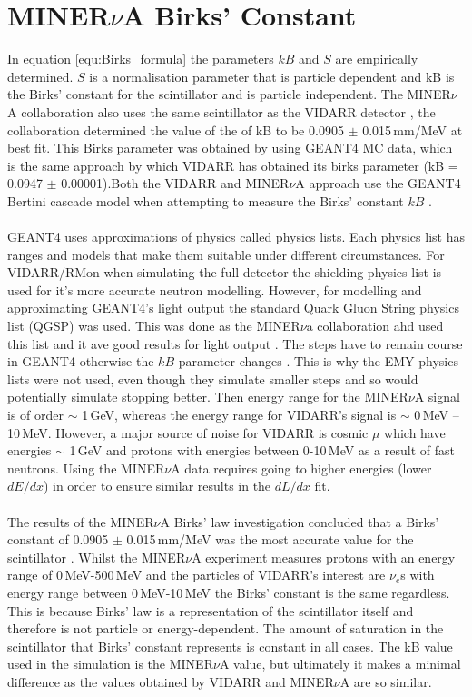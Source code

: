 \section{MINER$\nu$A Birks' Constant}\label{sec:GEANT4Simulation_MINERvABirksConstant}
In equation \ref{equ:Birks_formula} the parameters $kB$ and $S$ are empirically determined. $S$ is a normalisation parameter that is particle dependent and kB is the Birks' constant for the scintillator and is particle independent. The MINER$\nu$A collaboration \cite{aliaga_2015} also uses the same scintillator as the VIDARR detector \cite{aliaga_2014}, the collaboration determined the value of the of kB to be 0.0905 $\pm$ 0.015\,mm/MeV at best fit. This Birks parameter was obtained by using GEANT4 MC data, which is the same approach by which VIDARR has obtained its birks parameter (kB = 0.0947 $\pm$ 0.00001).Both the VIDARR and MINER$\nu$A approach use the GEANT4 Bertini cascade model when attempting to measure the Birks' constant $kB$ \cite{Heikkinen_2003}. 
\\\\GEANT4 uses approximations of physics called physics lists. Each physics list has ranges and models that make them suitable under different circumstances. For VIDARR/RMon when simulating the full detector the shielding physics list is used for it's more accurate neutron modelling. However, for modelling and approximating GEANT4's light output the standard Quark Gluon String physics list (QGSP) was used. This was done as the MINER$\nu$a collaboration ahd used this list and it ave good results for light output \cite{Patrick_2018}. The steps have to remain course in GEANT4 otherwise the $kB$ parameter changes  \cite{aliaga_2015}. This is why the EMY physics lists were not used, even though they simulate smaller steps and so would potentially simulate stopping better. Then energy range for the MINER$\nu$A signal is of order $\sim$ 1\,GeV, whereas the energy range for VIDARR's signal is $\sim$ 0\,MeV -- 10\,MeV. However, a major source of noise for VIDARR is cosmic $\mu$ which have energies $\sim$ 1\,GeV and protons with energies between 0-10\,MeV as a result of fast neutrons. Using the MINER$\nu$A data requires going to higher energies (lower $dE/dx$) in order to ensure similar results in the $dL/dx$ fit.  
\\\\The results of the MINER$\nu$A Birks' law investigation concluded that a Birks' constant of 0.0905 $\pm$ 0.015\,mm/MeV was the most accurate value for the scintillator \cite{aliaga_2015}. Whilst the MINER$\nu$A experiment measures protons with an energy range of 0\,MeV-500\,MeV and the particles of VIDARR's interest are $\overline{\nu_{e}}$s with energy range between 0\,MeV-10\,MeV the Birks' constant is the same regardless. This is because Birks' law is a representation of the scintillator itself and therefore is not particle or energy-dependent. The amount of saturation in the scintillator that Birks' constant represents is constant in all cases. The kB value used in the simulation is the MINER$\nu$A value, but ultimately it makes a minimal difference as the values obtained by VIDARR and MINER$\nu$A are so similar. 
